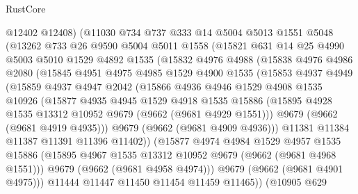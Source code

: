 \begin{lexlean}{RustCore}
\begin{coremodule}
          @12402
          @12408)
        (@11030
          @734
          @737
          @333
          @14
          @5004
          @5013
          @1551
          @5048
          (@13262
            @733
            @26
            @9590
            @5004
            @5011
            @1558
            (@15821
              @631
              @14
              @25
              @4990
              @5003
              @5010
              @1529
              @4892
              @1535
              (@15832
                @4976
                @4988
                (@15838
                  @4976
                  @4986
                  @2080
                  (@15845
                    @4951
                    @4975
                    @4985
                    @1529
                    @4900
                    @1535
                    (@15853
                      @4937
                      @4949
                      (@15859
                        @4937
                        @4947
                        @2042
                        (@15866
                          @4936
                          @4946
                          @1529
                          @4908
                          @1535
                          @10926
                          (@15877
                            @4935
                            @4945
                            @1529
                            @4918
                            @1535
                            @15886
                            (@15895 @4928 @1535 @13312 @10952 @9679 (@9662 (@9681 @4929 @1551)))
                            @9679
                            (@9662 (@9681 @4919 @4935)))
                          @9679
                          (@9662 (@9681 @4909 @4936)))
                        @11381
                        @11384
                        @11387
                        @11391
                        @11396
                        @11402))
                    (@15877
                      @4974
                      @4984
                      @1529
                      @4957
                      @1535
                      @15886
                      (@15895 @4967 @1535 @13312 @10952 @9679 (@9662 (@9681 @4968 @1551)))
                      @9679
                      (@9662 (@9681 @4958 @4974)))
                    @9679
                    (@9662 (@9681 @4901 @4975)))
                  @11444
                  @11447
                  @11450
                  @11454
                  @11459
                  @11465))
              (@10905
                @629

\end{coremodule}
\end{lexlean}
